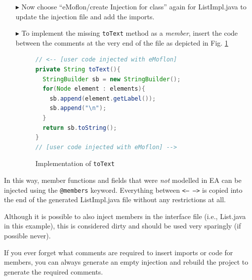 \begin{enumerate}
  \item[$\blacktriangleright$] Now choose ``eMoflon/create Injection for class'' again for \textsf{ListImpl.java} to update the injection file and add the imports.

  \item[$\blacktriangleright$] To implement the missing \texttt{toText} method as a \emph{member}, insert the code between the comments at the very end of the file as depicted in Fig. \ref{code:toText_impl}

\begin{figure}[htbp]
\centering
  \begin{lstlisting}[language=Java, keywordstyle={\bfseries\color{purple}}, backgroundcolor=\color{white}]
// <-- [user code injected with eMoflon]
private String toText(){
  StringBuilder sb = new StringBuilder();
  for(Node element : elements){
    sb.append(element.getLabel());
    sb.append("\n");
  }
  return sb.toString();
}
// [user code injected with eMoflon] -->
  \end{lstlisting}
\caption{Implementation of \texttt{toText}}
\label{code:toText_impl}
\end{figure}

\end{enumerate}

In this way, member functions and fields that were \emph{not} modelled in EA can be injected using the \texttt{@members} keyword. 
Everything between \texttt{<--  -->} is copied into the end of the generated \textsf{ListImpl.java} file without any restrictions at all.

Although it is possible to also inject members in the interface file (i.e., \textsf{List.java} in this example), this is considered dirty and should be used very sparingly (if possible never).

If you ever forget what comments are required to insert imports or code for members, you can always generate an empty injection and rebuild the project to generate the required comments.

\clearpage